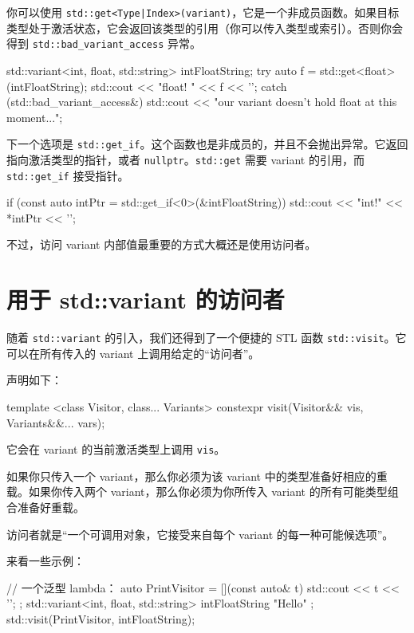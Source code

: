 你可以使用 \texttt{std::get<Type|Index>(variant)}，它是一个非成员函数。如果目标类型处于激活状态，它会返回该类型的引用（你可以传入类型或索引）。否则你会得到 \texttt{std::bad\_variant\_access} 异常。

\begin{codebox}[cpp]
std::variant<int, float, std::string> intFloatString;
try
{
auto f = std::get<float>(intFloatString);
std::cout << "float! " << f << '\n';
}
catch (std::bad_variant_access&)
{
std::cout << "our variant doesn't hold float at this moment...\n";
}
\end{codebox}

下一个选项是 \texttt{std::get\_if}。这个函数也是非成员的，并且不会抛出异常。它返回指向激活类型的指针，或者 \texttt{nullptr}。\texttt{std::get} 需要 variant 的引用，而 \texttt{std::get\_if} 接受指针。

\begin{codebox}[cpp]
if (const auto intPtr = std::get_if<0>(&intFloatString))
std::cout << "int!" << *intPtr << '\n';
\end{codebox}

不过，访问 variant 内部值最重要的方式大概还是使用访问者。

\section{用于 std::variant 的访问者}

随着 \texttt{std::variant} 的引入，我们还得到了一个便捷的 STL 函数 \texttt{std::visit}。它可以在所有传入的 variant 上调用给定的“访问者”。

声明如下：

\begin{codebox}[cpp]
template <class Visitor, class... Variants>
constexpr visit(Visitor&& vis, Variants&&... vars);
\end{codebox}

它会在 variant 的当前激活类型上调用 \texttt{vis}。

如果你只传入一个 variant，那么你必须为该 variant 中的类型准备好相应的重载。如果你传入两个 variant，那么你必须为你所传入 variant 的所有可能类型组合准备好重载。

访问者就是“一个可调用对象，它接受来自每个 variant 的每一种可能候选项”。

来看一些示例：

\begin{codebox}[cpp]
// 一个泛型 lambda：
auto PrintVisitor = [](const auto& t) { std::cout << t << '\n'; };
std::variant<int, float, std::string> intFloatString { "Hello" };
std::visit(PrintVisitor, intFloatString);
\end{codebox}

